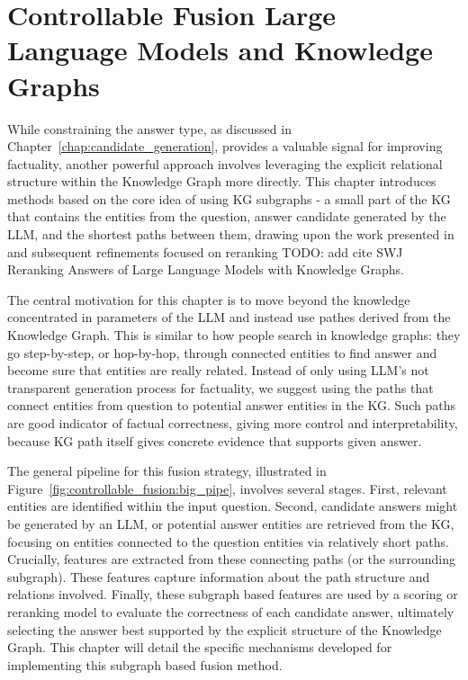 \chapter{Controllable Fusion Large Language Models and Knowledge Graphs}
\label{chap:controllable_fusion}


While constraining the answer type, as discussed in Chapter~\ref{chap:candidate_generation}, provides a valuable signal for improving factuality, another powerful approach involves leveraging the explicit relational structure within the Knowledge Graph more directly. This chapter introduces methods based on the core idea of using KG subgraphs - a small part of the KG that contains the entities from the question, answer candidate generated by the LLM, and the shortest paths between them, drawing upon the work presented in \cite{DBLP:journals/corr/abs-2310-02166} and subsequent refinements focused on reranking 
{\color{red} TODO: add cite SWJ Reranking Answers of Large Language Models with Knowledge Graphs}.

The central motivation for this chapter is to move beyond the knowledge concentrated in parameters of the LLM and instead use pathes derived from the Knowledge Graph. This is similar to how people search in knowledge graphs: they go step-by-step, or hop-by-hop, through connected entities to find answer and become sure that entities are really related. Instead of only using LLM's not transparent generation process for factuality, we suggest using the paths that connect entities from question to potential answer entities in the KG. Such paths are good indicator of factual correctness, giving more control and interpretability, because KG path itself gives concrete evidence that supports given answer.

The general pipeline for this fusion strategy, illustrated in Figure~\ref{fig:controllable_fusion:big_pipe}, involves several stages. First, relevant entities are identified within the input question. Second, candidate answers might be generated by an LLM, or potential answer entities are retrieved from the KG, focusing on entities connected to the question entities via relatively short paths. Crucially, features are extracted from these connecting paths (or the surrounding subgraph). These features capture information about the path structure and relations involved. Finally, these subgraph based features are used by a scoring or reranking model to evaluate the correctness of each candidate answer, ultimately selecting the answer best supported by the explicit structure of the Knowledge Graph. This chapter will detail the specific mechanisms developed for implementing this subgraph based fusion method.


